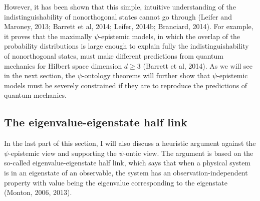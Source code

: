 However, it has been shown that this simple, intuitive understanding of the indistinguishability of nonorthogonal states cannot go through (Leifer and Maroney, 2013; Barrett et al, 2014; Leifer, 2014b; Branciard, 2014). For example, it proves that the maximally $\psi$-epistemic models, in which the overlap of the probability distributions is large enough to explain fully the indistinguishability of nonorthogonal states, must make different predictions from quantum mechanics for Hilbert space dimension $d \geq 3$ (Barrett et al, 2014). As we will see in the next section, the $\psi$-ontology theorems will further show that $\psi$-epistemic models must be severely constrained if they are to reproduce the predictions of quantum mechanics.



\subsection{The eigenvalue-eigenstate half link}

In the last part of this section, I will also discuss a heuristic argument against the $\psi$-epistemic view and supporting the $\psi$-ontic view. The argument is based on the so-called eigenvalue-eigenstate half link, which says that when a physical system is in an eigenstate of an observable, the system has an observation-independent property with value being the eigenvalue corresponding to the eigenstate (Monton, 2006, 2013).%

